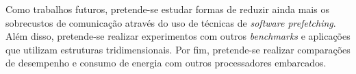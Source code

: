 Como trabalhos futuros, pretende-se estudar formas de reduzir ainda mais os
sobrecustos de comunicação através do uso de técnicas de \textit{software prefetching}.
Além disso, pretende-se realizar experimentos com outros
\textit{benchmarks} e aplicações que utilizam estruturas tridimensionais. Por
fim, pretende-se realizar comparações de desempenho e consumo de energia com
outros processadores embarcados.

